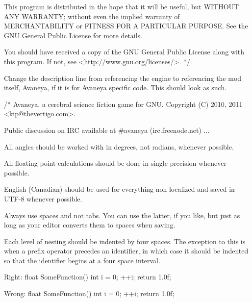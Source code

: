     This program is distributed in the hope that it will be useful,
    but WITHOUT ANY WARRANTY; without even the implied warranty of
    MERCHANTABILITY or FITNESS FOR A PARTICULAR PURPOSE.  See the
    GNU General Public License for more details.

    You should have received a copy of the GNU General Public License
    along with this program.  If not, see <http://www.gnu.org/licenses/>.
*/
\stoptyping
\stopCodeExample

Change the description line from referencing the engine to referencing the mod itself, Avaneya, if it is for Avaneya specific code. This should look as such.

\startCodeExample
\starttyping
/*
    Avaneya, a cerebral science fiction game for GNU.
    Copyright (C) 2010, 2011 <kip@thevertigo.com>.

    Public discussion on IRC available at #avaneya (irc.freenode.net)
    ...
\stoptyping
\stopCodeExample


\startitemize[3]
\setupwhitespace[big]
\item
All angles should be worked with in degrees, not radians, whenever possible.

\item
All floating point calculations should be done in single precision whenever possible.
\stopitemize


\startitemize[3]
\setupwhitespace[big]
\item
English (Canadian) should be used for everything non-localized and saved in UTF-8 whenever possible.

\item
Always use spaces and not tabs. You can use the latter, if you like, but just as long as your editor converts them to spaces when saving.

\item
Each level of nesting should be indented by four spaces. The exception to this is when a prefix operator precedes an identifier, in which case it should be indented so that the identifier begins at a four space interval.

Right:
\startCodeExample
\starttyping
float SomeFunction()
{
    int i = 0;
  ++i;
    return 1.0f;
}
\stoptyping
\stopCodeExample

Wrong:
\startCodeExample
\starttyping
float SomeFunction()
{
    int i = 0;
    ++i;
        return 1.0f;
}
\stoptyping
\stopCodeExample

